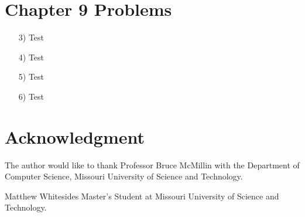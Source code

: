 \documentclass[journal,onecolumn]{IEEEtran}
\begin{document}
\section{Chapter 9 Problems}

\begin{enumerate}
  \item [3)] Test
  \item [4)] Test
  \item [5)] Test
  \item [6)] Test
\end{enumerate}




\section*{Acknowledgment}
The author would like to thank Professor Bruce McMillin with the Department of Computer Science, Missouri University of Science and Technology.

\ifCLASSOPTIONcaptionsoff
  \newpage
\fi

\begin{IEEEbiographynophoto}{Matthew Whitesides}
  Master's Student at Missouri University of Science and Technology.
\end{IEEEbiographynophoto}

\end{document}

